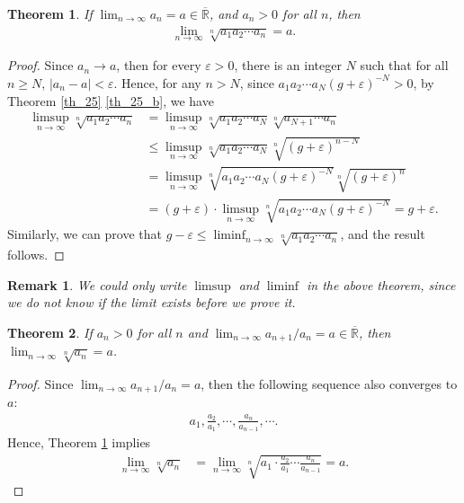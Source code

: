 \documentclass[11pt]{book}
\newtheorem{theorem}{Theorem}[chapter]
\newtheorem{remark}{Remark}[chapter]
\theoremstyle{definition}
\numberwithin{equation}{chapter}
\begin{document}
\medskip

\begin{theorem}\label{th_27}
If $\lim_{n\to\infty} a_n = a \in \overline{\mathbb{R}}$, and $a_n > 0$ for all $n$, then
\begin{align*}
    \lim_{n\to\infty} \sqrt[n]{a_1 a_2 \cdots a_n} = a.
\end{align*}
\end{theorem}
\begin{proof}
Since $a_n \to a$, then for every $\varepsilon > 0$, there is an integer $N$ such that for all $n \geq N$, $\left|a_n - a\right| < \varepsilon$. Hence, for any $n > N$, since $a_1 a_2 \cdots a_N (g+\varepsilon)^{-N} > 0$, by Theorem \ref{th_25} \ref{th_25_b}, we have
\begin{align*}
    \limsup_{n\to\infty} \sqrt[n]{a_1 a_2 \cdots a_n} & = \limsup_{n\to\infty} \sqrt[n]{a_1 a_2 \cdots a_N} \sqrt[n]{a_{N+1}\cdots a_n} \\
    & \leq \limsup_{n\to\infty} \sqrt[n]{a_1 a_2 \cdots a_N} \sqrt[n]{(g+\varepsilon)^{n-N}} \\
    & = \limsup_{n\to\infty} \sqrt[n]{a_1 a_2 \cdots a_N (g+\varepsilon)^{-N}} \sqrt[n]{(g+\varepsilon)^n} \\
    & = (g+\varepsilon) \cdot \limsup_{n\to\infty} \sqrt[n]{a_1 a_2 \cdots a_N (g+\varepsilon)^{-N}} = g+\varepsilon.
\end{align*}
Similarly, we can prove that $g - \varepsilon \leq \liminf_{n\to\infty} \sqrt[n]{a_1 a_2 \cdots a_n}$, and the result follows.
\end{proof}

\begin{remark}
We could only write $\limsup$ and $\liminf$ in the above theorem, since we do not know if the limit exists before we prove it. 
\end{remark}

\medskip

\begin{theorem}
If $a_n > 0$ for all $n$ and $\lim_{n\to\infty} a_{n+1}/a_n = a \in \overline{\mathbb{R}}$, then $\lim_{n\to\infty} \sqrt[n]{a_n} = a$.
\end{theorem}
\begin{proof}
Since $\lim_{n\to\infty} a_{n+1}/a_n = a$, then the following sequence also converges to $a$:
\begin{align*}
    a_1, \frac{a_2}{a_1}, \cdots, \frac{a_n}{a_{n-1}}, \cdots.
\end{align*}
Hence, Theorem \ref{th_27} implies
\begin{align*}
    \lim_{n\to\infty} \sqrt[n]{a_n} & = \lim_{n\to\infty} \sqrt[n]{a_1 \cdot \frac{a_2}{a_1} \cdots \frac{a_n}{a_{n-1}}} = a.
\end{align*}
\end{proof}
\end{document}
